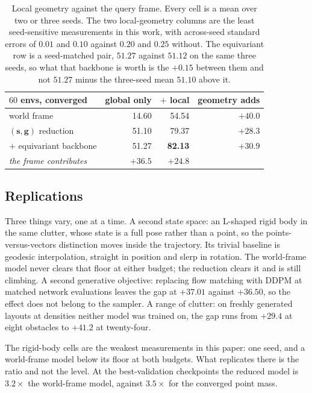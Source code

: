 \documentclass[conference]{IEEEtran}
\newcommand{\svec}{\mathbf{s}}
\newcommand{\gvec}{\mathbf{g}}
\begin{document}
\begin{table}[t]
\centering
\footnotesize
\setlength{\tabcolsep}{3.5pt}
\begin{tabular}{@{}lrrr@{}}
\toprule
$60$ envs, converged & global only & $+$ local & geometry adds \\
\midrule
world frame                    & 14.60 & 54.54 & $+40.0$ \\
$(\svec,\gvec)$ reduction      & 51.10 & 79.37 & $+28.3$ \\
\quad $+$ equivariant backbone & 51.27 & \textbf{82.13} & $+30.9$ \\
\midrule
\emph{the frame contributes}   & $+36.5$ & $+24.8$ & \\
\bottomrule
\end{tabular}
\caption{Local geometry against the query frame. Every cell is a mean over two or
three seeds. The two local-geometry columns are the least seed-sensitive
measurements in this work, with across-seed standard errors of $0.01$ and $0.10$
against $0.20$ and $0.25$ without. The equivariant row is a seed-matched pair,
$51.27$ against $51.12$ on the same three seeds, so what that backbone is worth
is the $+0.15$ between them and not $51.27$ minus the three-seed mean $51.10$
above it.}
\label{tab:twobytwo}
\end{table}

\subsection{Replications}
\label{sec:replications}
Three things vary, one at a time. A second state space: an L-shaped rigid body in
the same clutter, whose state is a full pose rather than a point, so the
points-versus-vectors distinction moves inside the trajectory. Its trivial
baseline is geodesic interpolation, straight in position and slerp in rotation.
The world-frame model never clears that floor at either budget; the reduction
clears it and is still climbing. A second generative objective: replacing flow
matching with DDPM at matched network evaluations leaves the gap at $+37.01$
against $+36.50$, so the effect does not belong to the sampler. A range of
clutter: on freshly generated layouts at densities neither model was trained on,
the gap runs from $+29.4$ at eight obstacles to $+41.2$ at twenty-four.

The rigid-body cells are the weakest measurements in this paper: one seed, and
a world-frame model below its floor at both budgets. What replicates there is
the ratio and not the level. At the best-validation checkpoints the reduced model
is $3.2\times$ the world-frame model, against $3.5\times$ for the converged point
mass.
\end{document}
